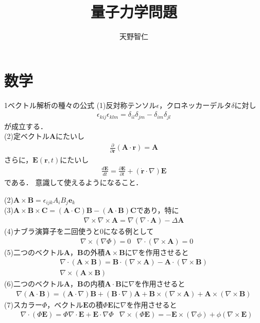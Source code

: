 \documentclass[a4j]{jarticle}
\title{量子力学問題}
\author{天野智仁}
\begin{document}
\section{数学}
1ベクトル解析の種々の公式
(1)反対称テンソル$\epsilon$，クロネッカーデルタ$\delta$に対し
\begin{align*}
 \epsilon_{kij}\epsilon_{klm}=\delta_{il}\delta_{jm}-\delta_{im}\delta_{jl}
\end{align*}
が成立する．\\

(2)定ベクトル$\bm{A}$にたいし
\begin{align*}
 \frac{\partial}{\partial\bm{r}}(\bm{A}\cdot\bm{r})=\bm{A}
\end{align*}
さらに，$\bm{E}(\bm{r},t)$にたいし
\begin{align*}
 \frac{d\bm{E}}{dt}=\frac{\partial\bm{E}}{\partial t}+(\bm{\dot{r}}\cdot\nabla)\bm{E}
\end{align*}
である．
意識して使えるようになること．

(2)$\bm{A}\times\bm{B}=\epsilon_{ijk}A_iB_j\bm{e}_k$\\
(3)$\bm{A}\times\bm{B}\times\bm{C}=(\bm{A}\cdot\bm{C})\bm{B}-(\bm{A}\cdot\bm{B})\bm{C}$であり，特に
\begin{align*}
 \nabla\times\nabla\times\bm{A}=\nabla(\nabla\cdot\bm{A})-\Delta\bm{A}
\end{align*}
(4)ナブラ演算子を二回使うと$0$になる例として
\begin{align*}
 &\nabla\times(\nabla\Phi) =0& \nabla\cdot(\nabla\times\bm{A})=0
\end{align*}
(5)二つのベクトル$\bm{A}$，$\bm{B}$の外積$\bm{A}\times\bm{B}$に$\nabla$を作用させると
\begin{align*}
 \nabla\cdot(\bm{A}\times\bm{B})=\bm{B}\cdot(\nabla\times\bm{A})-\bm{A}\cdot(\nabla\times\bm{B}) \\
 \nabla\times(\bm{A}\times\bm{B}) 
\end{align*}
(6)二つのベクトル$\bm{A}$，$\bm{B}$の内積$\bm{A}\cdot\bm{B}$に$\nabla$を作用させると
\begin{align*}
 \nabla(\bm{A}\cdot\bm{B})=(\bm{A}\cdot\nabla)\bm{B}+(\bm{B}\cdot\nabla)\bm{A}
 +\bm{B}\times(\nabla\times\bm{A})+\bm{A}\times(\nabla\times\bm{B})
\end{align*}
(7)スカラー$\Phi$，ベクトル$\bm{E}$の積$\Phi\bm{E}$に$\nabla$を作用させると
\begin{align*}
&\nabla\cdot(\Phi\bm{E})=\Phi\nabla\cdot\bm{E}+\bm{E}\cdot\nabla\Phi 
&\nabla\times(\Phi\bm{E})=-\bm{E}\times(\nabla\phi)+\phi(\nabla\times\bm{E}) 
\end{align*}
\end{document}
